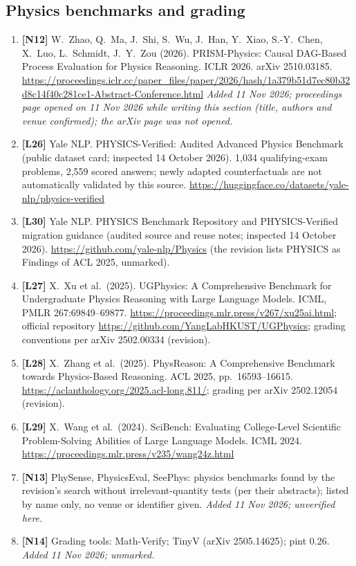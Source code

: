 \documentclass[10pt,a4paper]{article}
\begin{document}
{\subsection*{Physics benchmarks and grading}
\begin{enumerate}[label={},leftmargin=0pt]
\item \textbf{[N12]} W.~Zhao, Q.~Ma, J.~Shi, S.~Wu, J.~Han, Y.~Xiao, S.-Y.~Chen, X.~Luo, L.~Schmidt, J.~Y.~Zou (2026).
PRISM-Physics: Causal DAG-Based Process Evaluation for Physics Reasoning. ICLR 2026. arXiv 2510.03185.
\url{https://proceedings.iclr.cc/paper_files/paper/2026/hash/1a379b51d7ec80b32d8c14f40c281ce1-Abstract-Conference.html}
\emph{Added 11 Nov 2026; proceedings page opened on 11 Nov 2026 while writing this section (title, authors and
venue confirmed); the arXiv page was not opened.}
\item \textbf{[L26]} Yale NLP. PHYSICS-Verified: Audited Advanced Physics Benchmark (public dataset card; inspected
14 October 2026). 1{,}034 qualifying-exam problems, 2{,}559 scored answers; newly adapted counterfactuals are not
automatically validated by this source. \url{https://huggingface.co/datasets/yale-nlp/physics-verified}
\item \textbf{[L30]} Yale NLP. PHYSICS Benchmark Repository and PHYSICS-Verified migration guidance (audited
source and reuse notes; inspected 14 October 2026). \url{https://github.com/yale-nlp/Physics} (the revision lists
PHYSICS as Findings of ACL 2025, unmarked).
\item \textbf{[L27]} X.~Xu et al.\ (2025). UGPhysics: A Comprehensive Benchmark for Undergraduate Physics
Reasoning with Large Language Models. ICML, PMLR 267:69849--69877.
\url{https://proceedings.mlr.press/v267/xu25ai.html}; official repository
\url{https://github.com/YangLabHKUST/UGPhysics}; grading conventions per arXiv 2502.00334 (revision).
\item \textbf{[L28]} X.~Zhang et al.\ (2025). PhysReason: A Comprehensive Benchmark towards Physics-Based
Reasoning. ACL 2025, pp.~16593--16615. \url{https://aclanthology.org/2025.acl-long.811/}; grading per arXiv
2502.12054 (revision).
\item \textbf{[L29]} X.~Wang et al.\ (2024). SciBench: Evaluating College-Level Scientific Problem-Solving
Abilities of Large Language Models. ICML 2024. \url{https://proceedings.mlr.press/v235/wang24z.html}
\item \textbf{[N13]} PhySense, PhysicsEval, SeePhys: physics benchmarks found by the revision's search without
irrelevant-quantity tests (per their abstracts); listed by name only, no venue or identifier given.
\emph{Added 11 Nov 2026; unverified here.}
\item \textbf{[N14]} Grading tools: Math-Verify; TinyV (arXiv 2505.14625); pint 0.26. \emph{Added 11 Nov 2026;
unmarked.}
\end{enumerate}

}
\end{document}
